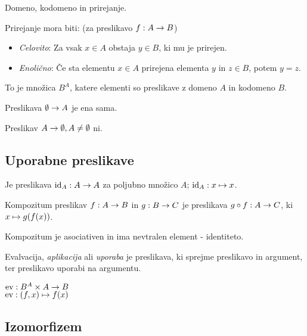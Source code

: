 
Domeno, kodomeno in prirejanje.

Prirejanje mora biti: (za preslikavo $f: A \to B$)
\begin{itemize}
	\item \textit{Celovito}: Za vsak $x \in A$ obstaja $y \in B$, ki mu je prirejen.
	\item \textit{Enolično}: Če sta elementu $x \in A$ prirejena elementa $y$ in $z \in B$, potem $y = z$.
\end{itemize}


To je množica $B^A$, katere elementi so preslikave z domeno $A$ in kodomeno $B$.


Preslikava $\emptyset \to A$ je ena sama.

Preslikav $A \to \emptyset, A \ne \emptyset$ ni.

\subsection{Uporabne preslikave}


Je preslikava $\mathrm{id}_A: A \to A$ za poljubno množico $A$; $\mathrm{id}_A: x \mapsto x$.


Kompozitum preslikav $f: A \to B$ in $g: B \to C$ je preslikava $g \circ f: A \to C$, ki $x \mapsto g(f(x))$.

Kompozitum je asociativen in ima nevtralen element - identiteto.


Evalvacija, \textit{aplikacija} ali \textit{uporaba} je preslikava, ki sprejme preslikavo in argument, ter preslikavo uporabi na argumentu.

$\text{ev}: B^A \times A \to B$\\
$\text{ev}: (f, x) \mapsto f(x)$

\subsection{Izomorfizem}

